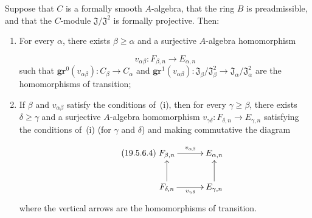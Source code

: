 \begin{lemma}[19.5.6.3]
\label{0.19.5.6.3}
Suppose that $C$ is a formally smooth $A$-algebra, that the ring $B$ is preadmissible, and that the $C$-module $\mathfrak{J}/\mathfrak{J}^2$ is formally projective.
Then:
\begin{enumerate}
  \item[\rm(i)] For every $\alpha$, there exists $\beta\geq\alpha$ and a surjective $A$-algebra homomorphism
  
\[
v_{\alpha\beta}:F_{\beta,n}\to E_{\alpha,n}
\]
  such that $\mathbf{gr}^0(v_{\alpha\beta}):C_\beta\to C_\alpha$ and $\mathbf{gr}^1(v_{\alpha\beta}):\mathfrak{J}_\beta/\mathfrak{J}_\beta^2\to\mathfrak{J}_\alpha/\mathfrak{J}_\alpha^2$ are the homomorphisms of transition;
  \item[\rm(ii)] If $\beta$ and $v_{\alpha\beta}$ satisfy the conditions of~{\rm(i)}, then for every $\gamma\geq\beta$, there exists $\delta\geq\gamma$ and a surjective $A$-algebra homomorphism $v_{\gamma\delta}:F_{\delta,n}\to E_{\gamma,n}$ satisfying the conditions of~{\rm(i)} (for $\gamma$ and $\delta$) and making commutative the diagram
  
\begin{equation}
\tag{19.5.6.4}
\label{0.19.5.6.4}
\xymatrix@C=3em{
      F_{\beta,n} \ar[r]^{v_{\alpha\beta}} & E_{\alpha,n} \\
      F_{\delta,n} \ar[u] \ar[r]_{v_{\gamma\delta}} & E_{\gamma,n} \ar[u]
    }
\end{equation}
  where the vertical arrows are the homomorphisms of transition.
\end{enumerate}
\end{lemma}

